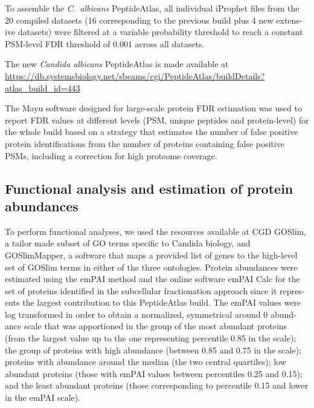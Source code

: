 \begin{otherlanguage}{british}
To assemble the \textit{\mbox{C. albicans}} PeptideAtlas, all individual iProphet files from the 20 compiled
datasets (16 corresponding to the previous build plus 4 new extensive datasets) were filtered
at a variable probability threshold to reach a constant PSM-level FDR threshold of 0.001
across all datasets.


The new \textit{Candida albicans} PeptideAtlas is made available at \newline
\href{https://db.systemsbiology.net/sbeams/cgi/PeptideAtlas/buildDetails?atlas_build_id=443}{https://db.systemsbiology.net/sbeams/cgi/PeptideAtlas/buildDetails?atlas\_build\_id=443}
\linebreak

The Mayu \citep{Reiter2009} software designed for large-scale protein FDR estimation was used to report
FDR values at different levels (PSM, unique peptides and protein-level) for the whole build
based on a strategy that estimates the number of false positive protein identifications from
the number of proteins containing false positive PSMs, including a correction for high
proteome coverage.



\subsection*{Functional analysis and estimation of protein abundances}

To perform functional analyses, we used the resources available at CGD GOSlim, a tailor
made subset of GO terms specific to Candida biology, and GOSlimMapper, a software that
maps a provided list of genes to the high-level set of GOSlim terms in either of the three
ontologies.
Protein abundances were estimated using the emPAI method \citep{Ishihama2005} and the online software
emPAI Calc \citep{Shinoda2010} for the set of proteins identified in the subcellular fractionation approach
since it represents the largest contribution to this PeptideAtlas build. The emPAI values were
log transformed in order to obtain a normalized, symmetrical around 0 abundance scale that
was apportioned in the group of the most abundant proteins (from the largest value up to the
one representing percentile 0.85 in the scale); the group of proteins with high abundance
(between 0.85 and 0.75 in the scale); proteins with abundance around the median (the two
central quartiles); low abundant proteins (those with emPAI values between percentiles 0.25
and 0.15); and the least abundant proteins (those corresponding to percentile 0.15 and lower
in the emPAI scale).




\end{otherlanguage}
